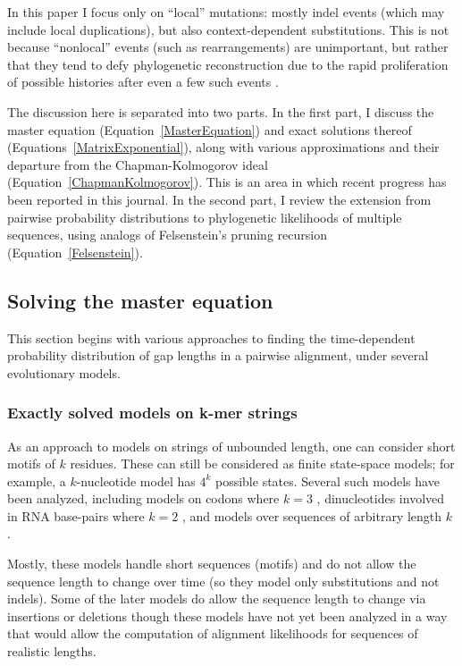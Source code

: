 \documentclass{bmcart}
\newcommand{\eqref}[1]{Equation~\ref{#1}}
\begin{document}
In this paper I focus only on ``local'' mutations: mostly indel events (which may include local duplications),
but also context-dependent substitutions.
This is not because ``nonlocal'' events (such as rearrangements) are unimportant,
but rather that they tend to defy phylogenetic reconstruction due to the rapid proliferation of possible histories
after even a few such events \cite{pmid9773350}.

The discussion here is separated into two parts.
In the first part, I discuss
the master equation (\eqref{MasterEquation})
and exact solutions thereof (Equations~\ref{MatrixExponential}),
along with various approximations and their departure from the Chapman-Kolmogorov ideal (\eqref{ChapmanKolmogorov}).
This is an area in which recent progress has been reported in this journal.
In the second part, I review
the extension from pairwise probability distributions
to phylogenetic likelihoods of multiple sequences,
using analogs of Felsenstein's pruning recursion (\eqref{Felsenstein}).

\subsection*{Solving the master equation}

This section begins with various approaches to finding the time-dependent probability distribution
of gap lengths in a pairwise alignment,
under several evolutionary models.

\subsubsection*{Exactly solved models on k-mer strings}

As an approach to models on strings of unbounded length, one can consider short motifs of $k$ residues.
These can still be considered as finite state-space models;
for example, a $k$-nucleotide model has $4^k$ possible states.
Several such models have been analyzed, including models on codons where $k=3$
\cite{pmid8281128,ChangBenner2004},
dinucleotides involved in RNA base-pairs where $k=2$ \cite{pmid7475089,KnudsenHein99,pmid17884102},
and models over sequences of arbitrary length $k$ \cite{LunterHein04,pmid26135206}.

Mostly, these models handle short sequences (motifs) and do not allow the sequence length to change over time
(so they model only substitutions and not indels).
Some of the later models do allow the sequence length to change via insertions or deletions
\cite{pmid26135206} though these models have not yet been analyzed in a way that would allow the
computation of alignment likelihoods for sequences of realistic lengths.
\end{document}
